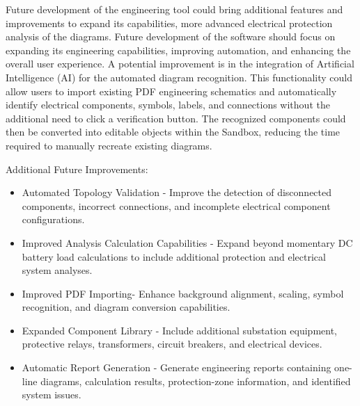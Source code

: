 Future development of the engineering tool could bring additional features and improvements 
to expand its capabilities, more advanced electrical protection analysis of the diagrams. 
Future development of the software should focus on expanding its engineering capabilities, 
improving automation, and enhancing the overall user experience. A potential improvement is 
in the integration of Artificial Intelligence (AI) for the automated diagram recognition. 
This functionality could allow users to import existing PDF engineering schematics and 
automatically identify electrical components, symbols, labels, and connections without the 
additional need to click a verification button. The recognized components could then be 
converted into editable objects within the Sandbox, reducing the time required to manually 
recreate existing diagrams.

Additional Future Improvements:
\begin{itemize}
  \item Automated Topology Validation - Improve the detection of disconnected components, incorrect connections, and incomplete electrical component configurations.
  \item Improved Analysis Calculation Capabilities - Expand beyond momentary DC battery load calculations to include additional protection and electrical system analyses. 
  \item Improved PDF Importing- Enhance background alignment, scaling, symbol recognition, and 
diagram conversion capabilities.
    \item Expanded Component Library - Include additional substation equipment, protective relays, 
transformers, circuit breakers, and electrical devices. 
    \item Automatic Report Generation - Generate engineering reports containing one-line diagrams,
calculation results, protection-zone information, and identified system issues.


\end{itemize}
